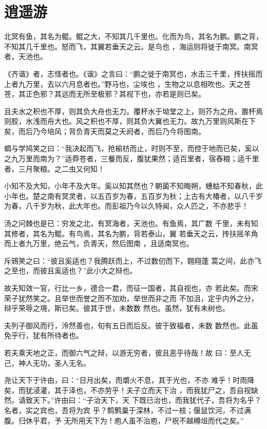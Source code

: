 \documentclass[12pt,UTF8]{ctexbook}
\begin{document}
\section{逍遥游}

北冥有鱼，其名为鲲。鲲之大，不知其几千里也。化而为鸟，其名为鹏。鹏之背，不知其几千里也。怒而飞，其翼若垂天之云。是鸟也 ，海运则将徙于南冥。南冥者，天池也。

《齐谐》者，志怪者也。《谐》之言曰：“鹏之徙于南冥也，水击三千里，抟扶摇而上者九万里，去以六月息者也。”野马也，尘埃也 ，生物之以息相吹也。天之苍苍，其正色邪？其远而无所至极邪？其视下也，亦若是则已矣。

且夫水之积也不厚，则其负大舟也无力。覆杯水于坳堂之上，则芥为之舟。置杯焉则胶，水浅而舟大也。风之积也不厚，则其负大翼也无力。故九万里则风斯在下矣，而后乃今培风；背负青天而莫之夭阏者，而后乃今将图南。

蜩与学鸠笑之曰：“我决起而飞，抢榆枋而止，时则不至，而控于地而已矣，奚以之九万里而南为？”适莽苍者，三餐而反，腹犹果然；适百里者，宿舂粮；适千里者，三月聚粮。之二虫又何知！

小知不及大知，小年不及大年。奚以知其然也？朝菌不知晦朔，蟪蛄不知春秋，此小年也。楚之南有冥灵者，以五百岁为春，五百岁为秋；上古有大椿者，以八千岁为春，八千岁为秋，此大年也。而彭祖乃今以久特闻，众人匹之，不亦悲乎！

汤之问棘也是已：穷发之北，有冥海者，天池也。有鱼焉，其广数 千里，未有知其修者，其名为鲲。有鸟焉，其名为鹏，背若泰山，翼 若垂天之云，抟扶摇羊角而上者九万里，绝云气，负青天，然后图南 ，且适南冥也。

斥鴳笑之曰：“彼且奚适也？我腾跃而上，不过数仞而下，翱翔蓬 蒿之间，此亦飞之至也，而彼且奚适也？”此小大之辩也。

故夫知效一官，行比一乡，德合一君，而征一国者，其自视也，亦 若此矣。而宋荣子犹然笑之。且举世而誉之而不加劝，举世而非之而 不加沮，定乎内外之分，辩乎荣辱之境，斯已矣。彼其于世，未数数 然也。虽然，犹有未树也。

夫列子御风而行，泠然善也，旬有五日而后反。彼于致福者，未数 数然也。此虽免乎行，犹有所待者也。

若夫乘天地之正，而御六气之辩，以游无穷者，彼且恶乎待哉！故 曰：至人无己，神人无功，圣人无名。

尧让天下于许由，曰：“日月出矣，而爝火不息，其于光也，不亦 难乎！时雨降矣，而犹浸灌，其于泽也，不亦劳乎！夫子立而天下治 ，而我犹尸之，吾自视缺然。请致天下。”许由曰：“子治天下，天 下既已治也，而我犹代子，吾将为名乎？名者，实之宾也，吾将为宾 乎？鹪鹩巢于深林，不过一枝；偃鼠饮河，不过满腹。归休乎君，予 无所用天下为！庖人虽不治庖，尸祝不越樽俎而代之矣。”
\end{document}
